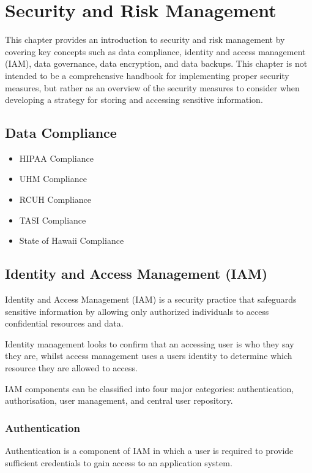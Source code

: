 \section{Security and Risk Management} \label{section: SARM}
This chapter provides an introduction to security and risk management by covering key concepts such as data compliance, identity and access management (IAM), data governance, data encryption, and data backups. This chapter is not intended to be a comprehensive handbook for implementing proper security measures, but rather as an overview of the security measures to consider when developing a strategy for storing and accessing sensitive information.

\subsection{Data Compliance}

\begin{itemize}
    \item HIPAA Compliance

    
    \item UHM Compliance
    \item RCUH Compliance
    \item TASI Compliance
    \item State of Hawaii Compliance
\end{itemize}

\subsection{Identity and Access Management (IAM)}
Identity and Access Management (IAM) is a security practice that safeguards sensitive information by allowing only authorized individuals to access confidential resources and data. 

Identity management looks to confirm that an accessing user is who they say they are, whilst access management uses a users identity to determine which resource they are allowed to access. 

IAM components can be classified into four major categories: authentication, authorisation, user management, and central user repository.

\subsubsection{Authentication}
Authentication is a component of IAM in which a user is required to provide sufficient credentials to gain access to an application system. 

